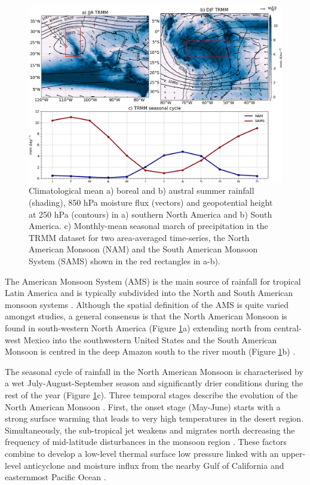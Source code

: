 \begin{figure}[t!]
\includegraphics[width=\linewidth]{figures/amsclim.png}
\caption[The American monsoon system climatology]{ Climatological mean a) boreal and b) austral summer rainfall (shading), 850 hPa moisture flux (vectors) and geopotential height at 250 hPa (contours) in a) southern North America and b) South America. c) Monthly-mean seasonal march of precipitation in the TRMM dataset for two area-averaged time-series, the North American Monsoon (NAM) and the South American Monsoon System (SAMS) shown in the red rectangles in a-b). }
\label{fig:americanmonsoon}
\end{figure}

The American Monsoon System (AMS) is the main source of rainfall for tropical Latin America and is typically subdivided into the North and South American monsoon systems \citep{vera2006}. 
Although the spatial definition of the AMS is quite varied amongst studies, a general consensus is that the North American Monsoon is found in south-western North America (Figure \ref{fig:americanmonsoon}a) extending north from central-west Mexico into the southwestern United States and the South American Monsoon is centred in the deep Amazon south to the river mouth (Figure \ref{fig:americanmonsoon}b) \citep{adams1997,stensrud1997,vera2006}.


 The seasonal cycle of rainfall in the North American Monsoon is characterised by a wet July-August-September season and significantly drier conditions during the rest of the year \citep{adams1997} (Figure \ref{fig:americanmonsoon}c).
Three temporal stages describe the evolution of the North American Monsoon \citep{adams1997,geil2013}.
First, the onset stage (May-June) starts with a strong surface warming that leads to very high temperatures in the desert region.
Simultaneously, the sub-tropical jet weakens and migrates north decreasing the frequency of mid-latitude disturbances in the monsoon region \citep{douglas1993,turrent2009}.
These factors combine to develop a low-level thermal surface low pressure linked with an upper-level anticyclone and  moisture influx from the nearby Gulf of California and easternmost Pacific Ocean \citep{douglas1993,geil2013}.

